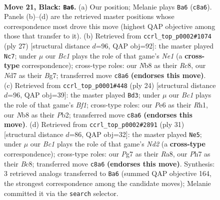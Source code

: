 \documentclass[11pt]{article}
\begin{document}
\clearpage

\begin{figure}[p]\centering
\begin{subfigure}{0.46\textwidth}\centering
\resizebox{\linewidth}{!}{%
\newchessgame
\chessboard[
  setfen={rnb1r1k1/2pnq1pp/1p2p3/p2pPp2/3P1P1P/P4N1Q/1PPKN1P1/1R3B1R b - - 4 21},
  showmover=false,
  pgfstyle=straightmove, color=movearrow, markmove={c8-a6}
]}
\caption{}
\end{subfigure}\hfill
\begin{subfigure}{0.46\textwidth}\centering
\resizebox{\linewidth}{!}{%
\newchessgame
\chessboard[
  setfen={2r1nrk1/pp1qppbp/2n3p1/3pP3/3P4/2N2N1P/PP2QPP1/1RBR2K1 b - - 0 14},
  showmover=false,
  pgfstyle=straightmove, color=movearrow, markmove={e8-c7}
]}
\caption{}
\end{subfigure}
\\[4pt]
\begin{subfigure}{0.46\textwidth}\centering
\resizebox{\linewidth}{!}{%
\newchessgame
\chessboard[
  setfen={r1b1k2r/ppp1qppp/2n1p1n1/1N1pP3/3P4/6QN/PPP2PP1/2KR1B1R w kq - 10 13},
  showmover=false,
  pgfstyle=straightmove, color=movearrow, markmove={f1-d3}
]}
\caption{}
\end{subfigure}\hfill
\begin{subfigure}{0.46\textwidth}\centering
\resizebox{\linewidth}{!}{%
\newchessgame
\chessboard[
  setfen={r1b1k2r/3n1p1p/1qpp1np1/p7/Pp2P3/1N1BN2P/1PPQ1PP1/R3K2R b KQkq - 2 16},
  showmover=false,
  pgfstyle=straightmove, color=movearrow, markmove={d7-e5}
]}
\caption{}
\end{subfigure}
\caption{\textbf{Move 21, Black: \texttt{Ba6}.} (a) Our position; Melanie plays \texttt{Ba6} (\texttt{c8a6}). Panels (b)--(d) are the retrieved master positions whose correspondence most drove this move (highest QAP objective among those that transfer to it). (b) Retrieved from \texttt{ccrl\_top\_p0002\#1074} (ply 27) [structural distance $d$=96, QAP obj=92]: the master played \texttt{Nc7}; under $\mu$ our \emph{Bc1} plays the role of that game's \emph{Ne1} (a \textbf{cross-type} correspondence); cross-type roles: our \emph{N}b8 as their \emph{R}c8, our \emph{N}d7 as their \emph{B}g7; transferred move \texttt{c8a6} \textbf{(endorses this move)}. (c) Retrieved from \texttt{ccrl\_top\_p0001\#448} (ply 24) [structural distance $d$=96, QAP obj=39]: the master played \texttt{Bd3}; under $\mu$ our \emph{Bc1} plays the role of that game's \emph{Bf1}; cross-type roles: our \emph{P}e6 as their \emph{R}h1, our \emph{N}b8 as their \emph{P}b2; transferred move \texttt{c8a6} \textbf{(endorses this move)}. (d) Retrieved from \texttt{ccrl\_top\_p0002\#2891} (ply 31) [structural distance $d$=86, QAP obj=32]: the master played \texttt{Ne5}; under $\mu$ our \emph{Bc1} plays the role of that game's \emph{Nd2} (a \textbf{cross-type} correspondence); cross-type roles: our \emph{P}g7 as their \emph{R}a8, our \emph{P}h7 as their \emph{B}c8; transferred move \texttt{c8a6} \textbf{(endorses this move)}. Synthesis: 3 retrieved analogs transferred to \texttt{Ba6} (summed QAP objective 164, the strongest correspondence among the candidate moves); Melanie committed it via the \texttt{search} selector.}
\label{fig:thought-m41}
\end{figure}
\end{document}
